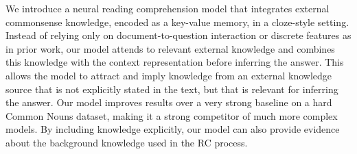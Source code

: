 We introduce a neural reading comprehension model that integrates external commonsense knowledge, encoded as a key-value memory, in a cloze-style setting. Instead of relying only on document-to-question interaction or discrete features as in prior work, our model attends to relevant external knowledge and combines this knowledge with the context representation before inferring the answer. This allows the model to attract and imply knowledge from an external knowledge source that is not explicitly stated in the text, but that is relevant for inferring the answer. Our model improves results over a very strong baseline on a hard Common Nouns dataset, making it a strong competitor of much more complex models. By including knowledge explicitly, our model can also provide evidence about the background knowledge used in the RC process.
